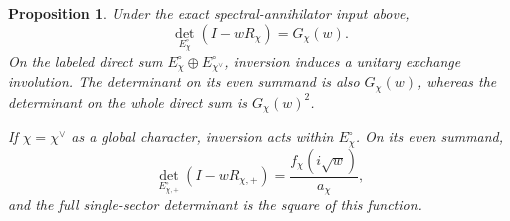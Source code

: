 \documentclass[11pt,a4paper]{article}
\newtheorem*{proposition}{Proposition}
\begin{document}
\begin{proposition}
Under the exact spectral-annihilator input above,
\begin{equation}\label{eq:MasCharacterFull}
 \det_{E_\chi^\circ}(I-wR_\chi)=G_\chi(w).
\end{equation}
On the labeled direct sum $E_\chi^\circ\oplus E_{\chi^\vee}^\circ$, inversion induces a unitary exchange involution. The determinant on its even summand is also $G_\chi(w)$, whereas the determinant on the whole direct sum is $G_\chi(w)^2$.

If $\chi=\chi^\vee$ as a global character, inversion acts within $E_\chi^\circ$. On its even summand,
\begin{equation}\label{eq:MasCharacterSelfdual}
 \det_{E_{\chi,+}^\circ}(I-wR_{\chi,+})
 =\frac{f_\chi(i\sqrt w)}{a_\chi},
\end{equation}
and the full single-sector determinant is the square of this function.
\end{proposition}
\end{document}
